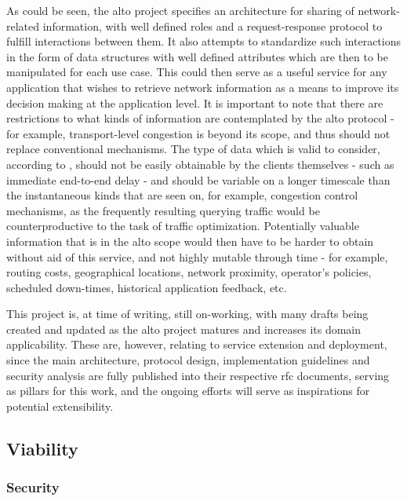     As could be seen, the \gls{alto} project specifies an architecture for sharing of network-related information, with well defined roles and a request-response protocol to fulfill interactions between them.
    It also attempts to standardize such interactions in the form of data structures with well defined attributes which are then to be manipulated for each use case.
    This could then serve as a useful service for any application that wishes to retrieve network information as a means to improve its decision making at the application level.
    It is important to note that there are restrictions to what kinds of information are contemplated by the \gls{alto} protocol - for example, transport-level congestion is beyond its scope, and thus should not replace conventional mechanisms.
    The type of data which is valid to consider, according to \cite{alto-problem-statement}, should not be easily obtainable by the clients themselves - such as immediate end-to-end delay - and should be variable on a longer timescale than the instantaneous kinds that are seen on, for example, congestion control mechanisms, as the frequently resulting querying traffic would be counterproductive to the task of traffic optimization.
    Potentially valuable information that is in the \gls{alto} scope would then have to be harder to obtain without aid of this service, and not highly mutable through time - for example, routing costs, geographical locations, network proximity, operator's policies, scheduled down-times, historical application feedback, etc.

    This project is, at time of writing, still on-working, with many drafts being created and updated as the \gls{alto} project matures and increases its domain applicability.
    These are, however, relating to service extension and deployment, since the main architecture, protocol design, implementation guidelines and security analysis are fully published into their respective \gls{rfc} documents, serving as pillars for this work, and the ongoing efforts will serve as inspirations for potential extensibility.

\subsection{Viability}

\subsubsection{Security}
\label{ssec:alto-security}

